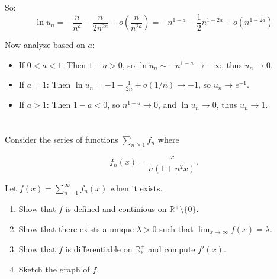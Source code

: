 \documentclass[12pt]{article}
\begin{document}
\begin{answerbox}
\begin{enumerate}
    So:
    \[
    \ln u_n = -\frac{n}{n^a} - \frac{n}{2n^{2a}} + o\left(\frac{n}{n^{2a}}\right) = -n^{1-a} - \frac{1}{2}n^{1-2a} + o(n^{1-2a})
    \]
    
    Now analyze based on $a$:
    
    \begin{itemize}
        \item If $0 < a < 1$: Then $1-a > 0$, so $\ln u_n \sim -n^{1-a} \to -\infty$, thus $u_n \to 0$.
        \item If $a = 1$: Then $\ln u_n = -1 - \frac{1}{2n} + o(1/n) \to -1$, so $u_n \to e^{-1}$.
        \item If $a > 1$: Then $1-a < 0$, so $n^{1-a} \to 0$, and $\ln u_n \to 0$, thus $u_n \to 1$.
    \end{itemize}
\end{enumerate}
\end{answerbox}

\section{}
Consider the series of functions \( \sum_{n \geq 1} f_n \) where

\[
f_n(x) = \frac{x}{n(1+n^2 x)}.
\]

Let \( f(x) = \sum_{n=1}^{\infty} f_n(x) \) when it exists.

\begin{enumerate}
    \item Show that $f$ is defined and continious on  \( \mathbb{R}^+ \setminus \{0\} \).
    \item Show that there exists a unique \( \lambda > 0 \) such that \( \lim_{x \to \infty}f(x) = \lambda \).
    \item Show that $f$ is differentiable on \( \mathbb{R}^+_*\) and compute \( f'(x) \). 
    \item Sketch the graph of \( f \).
\end{enumerate}
\end{document}
